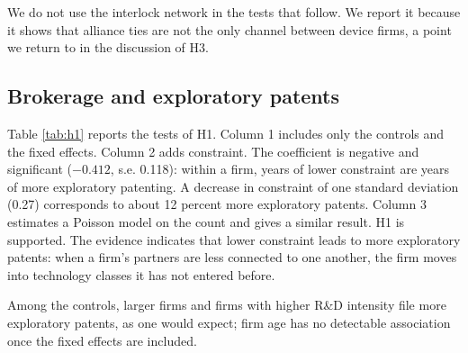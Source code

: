 \documentclass[12pt]{article}
\begin{document}
We do not use the interlock network in the tests that follow. We report it because it shows that alliance ties are not the only channel between device firms, a point we return to in the discussion of H3.

\subsection{Brokerage and exploratory patents}

Table \ref{tab:h1} reports the tests of H1. Column 1 includes only the controls and the fixed effects. Column 2 adds constraint. The coefficient is negative and significant ($-0.412$, s.e. 0.118): within a firm, years of lower constraint are years of more exploratory patenting. A decrease in constraint of one standard deviation (0.27) corresponds to about 12 percent more exploratory patents. Column 3 estimates a Poisson model on the count and gives a similar result. H1 is supported. The evidence indicates that lower constraint leads to more exploratory patents: when a firm's partners are less connected to one another, the firm moves into technology classes it has not entered before.

Among the controls, larger firms and firms with higher R\&D intensity file more exploratory patents, as one would expect; firm age has no detectable association once the fixed effects are included.
\end{document}
